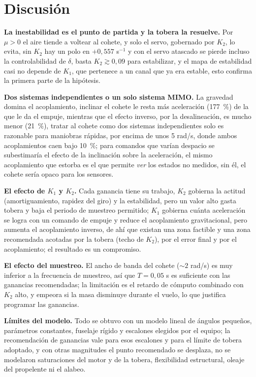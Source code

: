 \documentclass[article, 11pt]{IEEEtran}   %
\begin{document}
\section{Discusi\'on}
\textbf{La inestabilidad es el punto de partida y la tobera la resuelve.} Por $\mu>0$ el aire tiende a voltear al cohete, y solo el servo, gobernado por $K_2$, lo evita, sin $K_2$ hay un polo en $+0{,}557$ s$^{-1}$ y con el servo atascado se pierde incluso la controlabilidad de $\delta$, basta $K_2\gtrsim0{,}09$ para estabilizar, y el mapa de estabilidad casi no depende de $K_1$, que pertenece a un canal que ya era estable, esto confirma la primera parte de la hip\'otesis.

\textbf{Dos sistemas independientes o un solo sistema MIMO.} La gravedad domina el acoplamiento, inclinar el cohete le resta m\'as aceleraci\'on (177~\%) de la que le da el empuje, mientras que el efecto inverso, por la desalineaci\'on, es mucho menor (21~\%), tratar al cohete como dos sistemas independientes solo es razonable para maniobras r\'apidas, por encima de unos 5 rad/s, donde ambos acoplamientos caen bajo 10~\%; para comandos que var\'ian despacio se subestimar\'ia el efecto de la inclinaci\'on sobre la aceleraci\'on, el mismo acoplamiento que estorba es el que permite \emph{ver} los estados no medidos, sin \'el, el cohete ser\'ia opaco para los sensores.

\textbf{El efecto de $K_1$ y $K_2$.} Cada ganancia tiene su trabajo, $K_2$ gobierna la actitud (amortiguamiento, rapidez del giro) y la estabilidad, pero un valor alto gasta tobera y baja el periodo de muestreo permitido; $K_1$ gobierna cu\'anta aceleraci\'on se logra con un comando de empuje y reduce el acoplamiento gravitacional, pero aumenta el acoplamiento inverso, de ah\'i que existan una zona factible y una zona recomendada acotadas por la tobera (techo de $K_2$), por el error final y por el acoplamiento; el resultado es un compromiso.

\textbf{El efecto del muestreo.} El ancho de banda del cohete ($\sim2$ rad/s) es muy inferior a la frecuencia de muestreo, as\'i que $T=0{,}05$ s es suficiente con las ganancias recomendadas; la limitaci\'on es el retardo de c\'omputo combinado con $K_2$ alto, y empeora si la masa disminuye durante el vuelo, lo que justifica programar las ganancias.

\textbf{L\'imites del modelo.} Todo se obtuvo con un modelo lineal de \'angulos peque\~nos, par\'ametros constantes, fuselaje r\'igido y escalones elegidos por el equipo; la recomendaci\'on de ganancias vale para esos escalones y para el l\'imite de tobera adoptado, y con otras magnitudes el punto recomendado se desplaza, no se modelaron saturaciones del motor y de la tobera, flexibilidad estructural, oleaje del propelente ni el alabeo.
\end{document}
